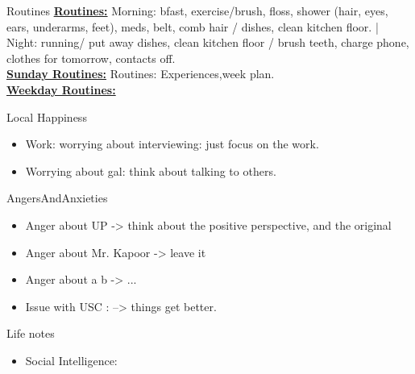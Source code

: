 \begin{columns}
    \begin{column}{0.25\linewidth}
      \begin{block}{Routines}
        { \tiny \underline{\bf Routines:} Morning: bfast, exercise/brush,
          floss, shower (hair, eyes, ears, underarms, feet), meds, belt,
          comb hair / dishes, clean kitchen floor. |  Night: running/ put
          away dishes, clean kitchen floor / brush teeth, charge phone,
          clothes for tomorrow, contacts off.}\\
        {\tiny \underline{\bf Sunday Routines:} Routines:
          Experiences,week plan.}\\ 
        {\tiny \underline{\bf Weekday Routines:}}\\
      \end{block} 
      \begin{block}{Local Happiness}
        \begin{itemize} 
          \tiny \item \tiny Work: worrying about interviewing: just
          focus on the work.
        \item \tiny Worrying about gal: think about talking to others.
        \end{itemize} 
      \end{block}
      \begin{block}{AngersAndAnxieties}
        \begin{itemize}
          \tiny \item \tiny Anger about UP -> think about the positive
          perspective, and the original
        \item \tiny Anger about Mr. Kapoor ->  leave it
        \item \tiny Anger about a b  -> ...
        \item \tiny Issue with USC : --> things get better. 
        \end{itemize}
      \end{block}
      \begin{block}{Life notes}
        \begin{itemize}
          \tiny \item \tiny Social Intelligence: 
        \end{itemize}
      \end{block}


\end{column}
\end{columns}
